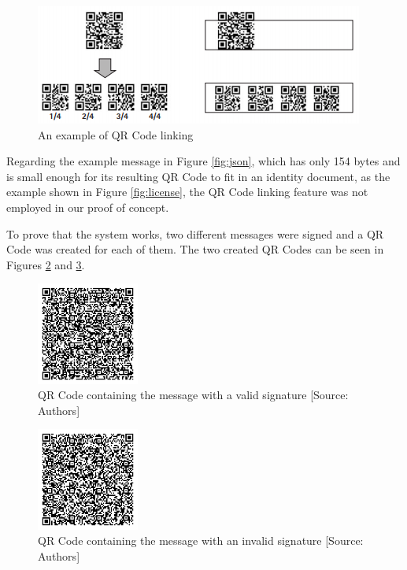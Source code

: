 \documentclass[12pt]{article}
\begin{document}
\begin{figure}[H]
    \centering
    \includegraphics{linking.png}
    \caption{An example of QR Code linking \cite{soon2008qr}}
    \label{fig:linking}
\end{figure}

Regarding the example message in Figure \ref{fig:json}, which has only 154 bytes and is small enough for its resulting QR Code to fit in an identity document, as the example shown in Figure \ref{fig:license}, the QR Code linking feature was not employed in our proof of concept. 

To prove that the system works, two different messages were signed and a QR Code was created for each of them. The two created QR Codes can be seen in Figures \ref{fig:qrcode1} and \ref{fig:qrcode2}.

\begin{figure}[H]
    \centering
    \includegraphics[width=0.3\textwidth]{qrcode1.png}
    \caption{QR Code containing the message with a valid signature [Source: Authors]}
    \label{fig:qrcode1}
\end{figure}

\begin{figure}[H]
    \centering
    \includegraphics[width=0.3\textwidth]{qrcode2.png}
    \caption{QR Code containing the message with an invalid signature [Source: Authors]}
    \label{fig:qrcode2}
\end{figure}
\end{document}
